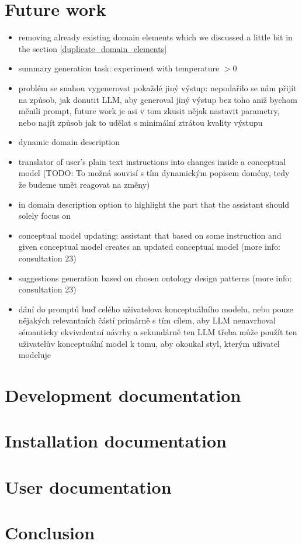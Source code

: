 \chapter{Future work}

\begin{itemize}
\item removing already existing domain elements which we discussed a little bit in the section \ref{duplicate_domain_elements}
\item summary generation task: experiment with temperature $> 0$
\item problém se snahou vygenerovat pokaždé jiný výstup: nepodařilo se nám přijít na způsob, jak donutit LLM, aby generoval jiný výstup bez toho aniž bychom měnili prompt, future work je asi v tom zkusit nějak nastavit parametry, nebo najít způsob jak to udělat s minimální ztrátou kvality výstupu \\
\item dynamic domain description
\item translator of user's plain text instructions into changes inside a conceptual model (TODO: To možná souvisí s tím dynamickým popisem domény, tedy že budeme umět reagovat na změny)
\item in domain description option to highlight the part that the assistant should solely focus on
\item conceptual model updating: assistant that based on some instruction and given conceptual model creates an updated conceptual model (more info: consultation 23)
\item suggestions generation based on chosen ontology design patterns (more info: consultation 23)
\item dání do promptů buď celého uživatelova konceptuálního modelu, nebo pouze nějakých relevantních částí primárně s tím cílem, aby LLM nenavrhoval sémanticky ekvivalentní návrhy a sekundárně ten LLM třeba může použít ten uživatelův konceptuální model k tomu, aby okoukal styl, kterým uživatel modeluje
\end{itemize}


\chapter{Development documentation}
\chapter{Installation documentation}
\chapter{User documentation}
\chapter{Conclusion}